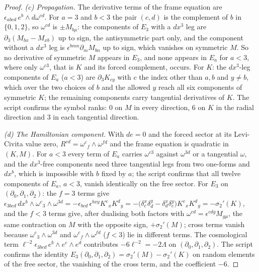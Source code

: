 \documentclass[11pt]{article}
\theoremstyle{definition}
\begin{document}
\begin{proof}
\emph{(c) Propagation.} The derivative terms of the frame equation are $\epsilon_{abcd}\,e^b\wedge d\omega^{cd}$. For $a = 3$ and $b < 3$ the pair $(c,d)$ is the complement of $b$ in $\{0,1,2\}$, so $\omega^{cd}$ is $\pm M_{b\mu}$: the components of $E_3$ with a $dx^3$ leg are $\partial_3(M_{bx} - M_{xb})$ up to sign, the antisymmetric part only, and the component without a $dx^3$ leg is $\epsilon^{bmn}\partial_m M_{bn}$ up to sign, which vanishes on symmetric $M$. So no derivative of symmetric $M$ appears in $E_3$, and none appears in $E_a$ for $a < 3$, where only $\omega^{c3}$, that is $K$ and its forced complement, occurs. For $K$: the $dx^3$-leg components of $E_a$ ($a < 3$) are $\partial_3 K_{c y}$ with $c$ the index other than $a, b$ and $y \neq b$, which over the two choices of $b$ and the allowed $y$ reach all six components of symmetric $K$; the remaining components carry tangential derivatives of $K$. The script confirms the symbol ranks: $0$ on $M$ in every direction, $6$ on $K$ in the radial direction and $3$ in each tangential direction.

\emph{(d) The Hamiltonian component.} With $de = 0$ and the forced sector at its Levi-Civita value zero, $R^{cd} = \omega^{c}{}_{f}\wedge\omega^{fd}$ and the frame equation is quadratic in $(K, M)$. For $a < 3$ every term of $E_a$ carries $\omega^{c3}$ against $\omega^{3d}$ or a tangential $\omega$, and the $dx^3$-free components need three tangential legs from two one-forms and $dx^b$, which is impossible with $b$ fixed by $a$; the script confirms that all twelve components of $E_a$, $a<3$, vanish identically on the free sector. For $E_3$ on $(\partial_0,\partial_1,\partial_2)$: the $f = 3$ terms give $\epsilon_{3bcd}\,dx^b\wedge\omega^{c}{}_{3}\wedge\omega^{3d} = -\epsilon_{bcd}\,\epsilon^{bxy}K^{c}{}_{x}K^{d}{}_{y} = -\bigl(\delta^x_c\delta^y_d - \delta^x_d\delta^y_c\bigr)K^{c}{}_{x}K^{d}{}_{y} = -\sigma_2'(K)$, and the $f < 3$ terms give, after dualising both factors with $\omega^{cd} = \epsilon^{cdg}M_{g\mu}$, the same contraction on $M$ with the opposite sign, $+\sigma_2'(M)$; cross terms vanish because $\omega^{c}{}_{3}\wedge\omega^{3d}$ and $\omega^{c}{}_{f}\wedge\omega^{fd}$ ($f<3$) lie in different terms. The cosmological term $\ell^{-2}\epsilon_{3bcd}\,e^b\wedge e^c\wedge e^d$ contributes $-6\ell^{-2} = -2\Lambda$ on $(\partial_0,\partial_1,\partial_2)$. The script confirms the identity $E_3(\partial_0,\partial_1,\partial_2) = \sigma_2'(M) - \sigma_2'(K)$ on random elements of the free sector, the vanishing of the cross term, and the coefficient $-6$.
\end{proof}
\end{document}
